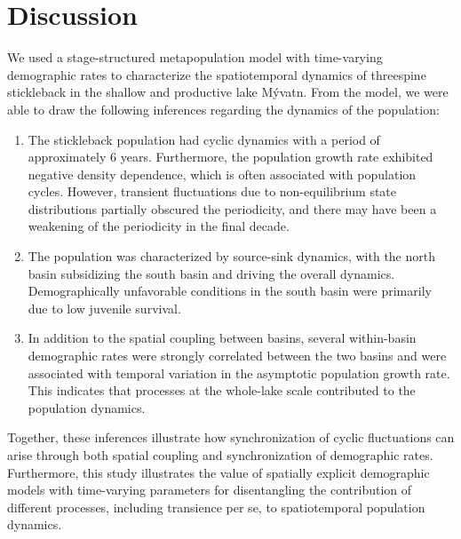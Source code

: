 

\section*{Discussion}

We used a stage-structured metapopulation model 
with time-varying demographic rates to characterize the 
spatiotemporal dynamics of threespine stickleback 
in the shallow and productive lake M\'{y}vatn.
From the model, we were able to draw the following inferences regarding the 
dynamics of the population:
%
\begin{enumerate}[label=(\alph*)]
\item
The stickleback population had cyclic dynamics with a period of approximately 6 years.
Furthermore, the population growth rate exhibited negative density dependence,
which is often associated with population cycles.
However, transient fluctuations due to non-equilibrium state distributions
partially obscured the periodicity,
and there may have been a weakening of the periodicity in the final decade.
%
\item
The population was characterized by source-sink dynamics, 
with the north basin subsidizing the south basin and driving the overall dynamics. 
Demographically unfavorable conditions in the south basin were 
primarily due to low juvenile survival.
%
\item
In addition to the spatial coupling between basins,
several within-basin demographic rates were strongly correlated 
between the two basins and 
were associated with temporal variation in the asymptotic population growth rate.
This indicates that processes at the whole-lake scale contributed 
to the population dynamics.
\end{enumerate}
%
Together, these inferences illustrate how synchronization of cyclic fluctuations 
can arise through both spatial coupling and synchronization of demographic rates.
Furthermore, this study illustrates the value of spatially explicit demographic models 
with time-varying parameters for disentangling the contribution of different processes,
including transience per se, to spatiotemporal population dynamics.

